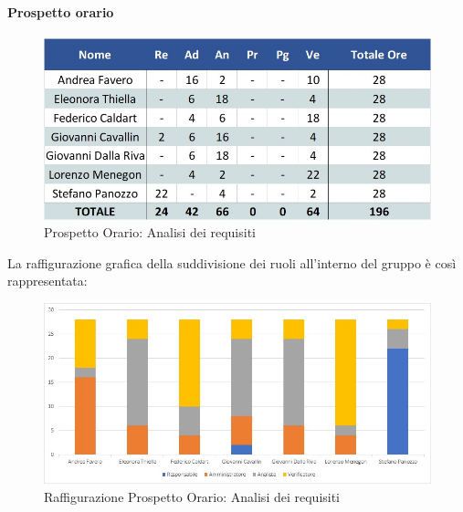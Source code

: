 \paragraph{Prospetto orario}
\begin{figure}[h!]
	\centerline{\includegraphics[scale=0.4]{img/Preventivo/AnalisiRequisiti.Orario.jpg}}
	\caption{Prospetto Orario: Analisi dei requisiti}
\end{figure}
La raffigurazione grafica della suddivisione dei ruoli all'interno del gruppo è così rappresentata: 
\begin{figure}[h!]
	\centerline{\includegraphics[scale=0.4]{img/Preventivo/Istogrammi/AnalisiRequisiti.jpg}}
	\caption{Raffigurazione Prospetto Orario: Analisi dei requisiti}
\end{figure}
